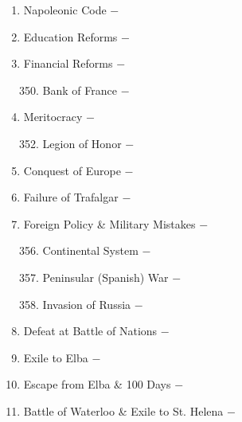 \documentclass[12pt]{article}
\begin{document}
\begin{enumerate}
\item Napoleonic Code $-$ 

\item Education Reforms $-$ 

\item Financial Reforms $-$ 


\begin{enumerate}[label=\arabic{*}.]
\setcounter{enumii}{349}

\item Bank of France $-$

\end{enumerate}
\setcounter{enumi}{350}

\item Meritocracy $-$ 

\begin{enumerate}[label=\arabic{*}.]
\setcounter{enumii}{351}

\item Legion of Honor $-$ 

\end{enumerate}
\setcounter{enumi}{352}

\item Conquest of Europe $-$ 

\item Failure of Trafalgar $-$ 

\item Foreign Policy \& Military Mistakes $-$ 

\begin{enumerate}[label=\arabic{*}.]
\setcounter{enumii}{355}

\item Continental System $-$

\item Peninsular (Spanish) War $-$

\item Invasion of Russia $-$ 

\end{enumerate}
\setcounter{enumi}{358}

\item Defeat at Battle of Nations $-$ 

\item Exile to Elba $-$ 

\item Escape from Elba \& 100 Days $-$ 

\item Battle of Waterloo \& Exile to St. Helena $-$ 


\end{enumerate}
\end{document}
